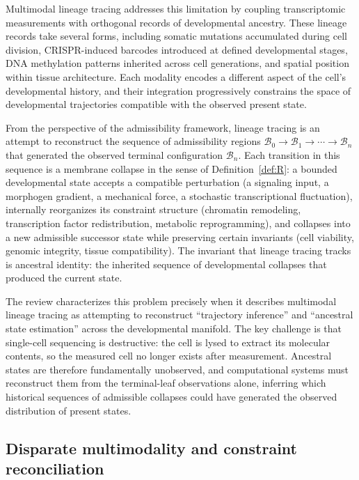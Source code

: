 \documentclass[12pt, a4paper]{article}
\theoremstyle{plain}
\theoremstyle{definition}
\theoremstyle{remark}
\newcommand{\Bcal}{\mathcal{B}}
\begin{document}
Multimodal lineage tracing addresses this limitation by coupling
transcriptomic measurements with orthogonal records of developmental
ancestry.
These lineage records take several forms, including somatic mutations
accumulated during cell division, CRISPR-induced barcodes introduced
at defined developmental stages, DNA methylation patterns inherited across
cell generations, and spatial position within tissue architecture.
Each modality encodes a different aspect of the cell's developmental
history, and their integration progressively constrains the space of
developmental trajectories compatible with the observed present state.

From the perspective of the admissibility framework, lineage tracing is
an attempt to reconstruct the sequence of admissibility regions
$\Bcal_0 \to \Bcal_1 \to \cdots \to \Bcal_n$ that generated the observed
terminal configuration $\Bcal_n$.
Each transition in this sequence is a membrane collapse in the sense of
Definition~\ref{def:R}: a bounded developmental state accepts a compatible
perturbation (a signaling input, a morphogen gradient, a mechanical force,
a stochastic transcriptional fluctuation), internally reorganizes its
constraint structure (chromatin remodeling, transcription factor
redistribution, metabolic reprogramming), and collapses into a new
admissible successor state while preserving certain invariants (cell
viability, genomic integrity, tissue compatibility).
The invariant that lineage tracing tracks is ancestral identity: the
inherited sequence of developmental collapses that produced the current
state.

The review characterizes this problem precisely when it describes
multimodal lineage tracing as attempting to reconstruct ``trajectory
inference'' and ``ancestral state estimation'' across the developmental
manifold.
The key challenge is that single-cell sequencing is destructive: the cell
is lysed to extract its molecular contents, so the measured cell no longer
exists after measurement.
Ancestral states are therefore fundamentally unobserved, and computational
systems must reconstruct them from the terminal-leaf observations alone,
inferring which historical sequences of admissible collapses could have
generated the observed distribution of present states.

\subsection{Disparate multimodality and constraint reconciliation}
\end{document}
